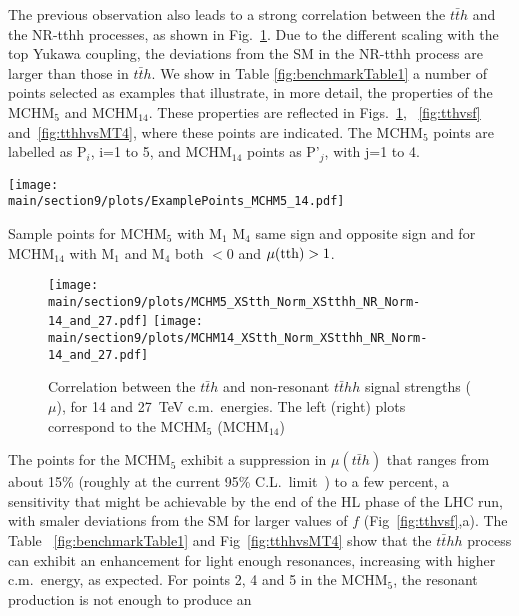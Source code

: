 The previous observation also leads to a strong correlation between the $t\bar{t}h$ and the NR-tthh processes, as shown in Fig.~\ref{fig:nrtthhvstth}. Due to the different scaling with the top Yukawa coupling, the deviations from the SM in the NR-tthh process are larger than those in $t\bar{t}h$.
\label{benchmarks}
We show in Table \ref{fig:benchmarkTable1} 
a number of points selected as examples that illustrate, in
more detail, the properties of the MCHM$_5$ and MCHM$_{14}$.  
These properties are reflected in Figs.~\ref{fig:nrtthhvstth}, ~\ref{fig:tthvsf} and~\ref{fig:tthhvsMT4}, where these points are indicated. The MCHM$_5$ points are labelled as P$_i$, i=1 to 5, and MCHM$_{14}$ points as P'$_j$, with j=1 to 4.
%
\begin{table}[t]
\centering
\texttt{[image: \\main/section9/plots/ExamplePoints\_MCHM5\_14.pdf]}
\caption{Sample points for MCHM$_5$ with M$_1$ M$_4$ same sign and opposite sign and for MCHM$_{14}$ with M$_1$ and M$_4$ both $<0$ and $\mu({\rm tth})>1$.}
\label{fig:benchmarkTable1}
\end{table}
%
\begin{figure}[t]
\centering
\texttt{[image: \\main/section9/plots/MCHM5\_XStth\_Norm\_XStthh\_NR\_Norm-14\_and\_27.pdf]}
\hspace{1.5cm}
\texttt{[image: \\main/section9/plots/MCHM14\_XStth\_Norm\_XStthh\_NR\_Norm-14\_and\_27.pdf]}
\caption{Correlation between the $t\bar{t}h$ and
non-resonant $t\bar{t}hh$ signal strengths ($\mu$), for 14 and 27~TeV c.m.~energies. The left (right) plots correspond to the MCHM$_5$ (MCHM$_{14}$)}
\label{fig:nrtthhvstth}
\end{figure}
%
The points for the MCHM$_5$ exhibit a suppression in $\mu(t\bar{t}h)$ that ranges from about 15\% (roughly at the current
95\% C.L.~limit~\cite{Aaboud:2018urx, Sirunyan:2018hoz}) to a few
percent, a sensitivity that might be achievable by the end of the HL
phase of the LHC run, with smaler deviations from the SM for larger values of $f$ (Fig~\ref{fig:tthvsf},a). The Table ~\ref{fig:benchmarkTable1} and Fig~\ref{fig:tthhvsMT4} show that the
$t\bar{t}hh$ process can exhibit an enhancement for light enough
resonances, increasing with higher c.m.~energy, as expected. For points 2, 4 and 5 in the MCHM$_{5}$, the resonant production is not enough to produce an
